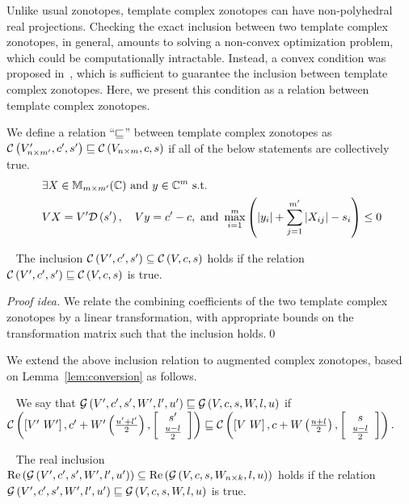 Unlike usual zonotopes, template complex zonotopes can have
non-polyhedral real projections.  Checking the exact inclusion between
two template complex zonotopes, in general, amounts to solving a
non-convex optimization problem, which could be computationally
intractable.  Instead, a convex condition was proposed
in~\cite{tcz2017}, which is sufficient to guarantee the inclusion
between template complex zonotopes.  Here, we present this condition
as a relation between template complex zonotopes.
%
\begin{definition}
We define a relation ``$\order$'' between template complex zonotopes
as\\ $\cz{V^\pr_{n\times m^\pr}}{c^\pr}{s^\pr}\order \cz{V_{n\times
    m}}{c}{s}$ if all of the below statements are collectively true.
\begin{align}~\label{eqn:tcz-inc}
\begin{split}
& \exists X\in\mat{m}{m^\pr}{\mb{C}}~\text{and}~y\in\mb{C}^{m}~\text{s.t.}\\
& \transfer{V}{V^\pr}{s^\pr}{X},~~~\centertransfer{V}{c}{c^\pr}{y},~\text{and}~
 \scalebound{X}{y}{s}{m}{m^\pr}\leq 0\\
\end{split}
\end{align}
\end{definition}
%
\begin{lemma}~\label{lem:zon-zon} The
inclusion $\cz{V^\pr}{c^\pr}{s^\pr}\subseteq \cz{V}{c}{s}$ holds if
the relation $\cz{{V^\pr}}{c^\pr}{s^\pr}\order \cz{V}{c}{s}$ is true.
\end{lemma}
\emph{Proof idea.}
We relate the combining
coefficients of the two template complex zonotopes by a linear
transformation, with appropriate bounds on the transformation matrix
such that the inclusion holds.\qed

We extend the above inclusion relation to augmented complex zonotopes,
based on Lemma~\ref{lem:conversion} as follows.
%
\begin{definition}~\label{defn:gcz-order}
We say that $\gcz{V^\pr}{c^\pr}{s^\pr}{W^\pr}{l^\pr}{u^\pr}\order
\gcz{V}{c}{s}{W}{l}{u}$ if\\ $\cz{\lt[V^\pr~W^\pr\rt]}{c^\pr+W^\pr\lt(\frac{u^\pr+l^\pr}{2}\rt)}{\ColumnJoin{s^\pr}{\frac{u-l}{2}}}
\order
\cz{\lt[V~W\rt]}{c+W\lt(\frac{u+l}{2}\rt)}{\ColumnJoin{s}{\frac{u-l}{2}}}.$
\end{definition}
%
\begin{lemma}~\label{lem:gcz-gcz} The real inclusion\\
$\real\lt(\gcz{V^\pr}{c^\pr}{s^\pr}{W^\pr}{l^\pr}{u^\pr}\rt)\subseteq \real\lt(\gcz{V}{c}{s}{W_{n\times
k}}{l}{u}\rt)$ holds if the relation\\
$\gcz{V^\pr}{c^\pr}{s^\pr}{W^\pr}{l^\pr}{u^\pr}\order \gcz{V}{c}{s}{W}{l}{u}$ is true.
\end{lemma}


